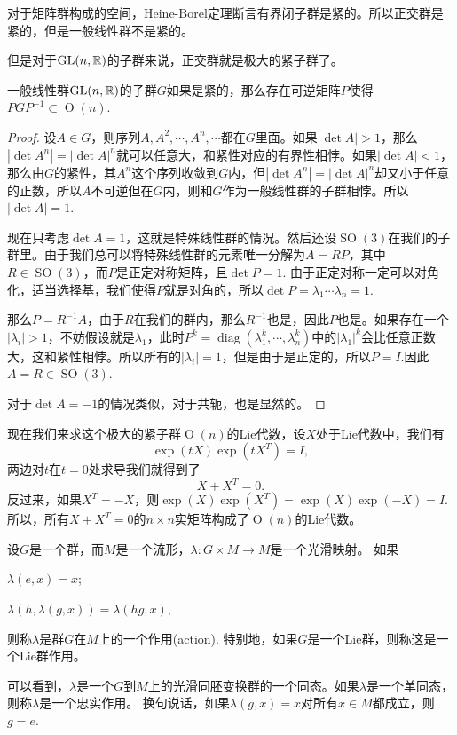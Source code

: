 对于矩阵群构成的空间，Heine-Borel定理断言有界闭子群是紧的。所以正交群是紧的，但是一般线性群不是紧的。

但是对于$\operatorname{GL}(n,\mathbb{R})$的子群来说，正交群就是极大的紧子群了。

\begin{pro}
一般线性群$\operatorname{GL}(n,\mathbb{R})$的子群$G$如果是紧的，那么存在可逆矩阵$P$使得$PGP^{-1}\subset \operatorname{O}(n)$.
\end{pro} 

\begin{proof}
设$A\in G$，则序列$A,A^2,\cdots,A^n,\cdots$都在$G$里面。如果$|\det A|>1$，那么$|\det A^n|=|\det A|^n$就可以任意大，和紧性对应的有界性相悖。如果$|\det A|<1$，那么由$G$的紧性，其$A^n$这个序列收敛到$G$内，但$|\det A^n|=|\det A|^n$却又小于任意的正数，所以$A$不可逆但在$G$内，则和$G$作为一般线性群的子群相悖。所以$|\det A|=1$.

现在只考虑$\det A=1$，这就是特殊线性群的情况。然后还设$\operatorname{SO}(3)$在我们的子群里。由于我们总可以将特殊线性群的元素唯一分解为$A=RP$，其中$R\in \operatorname{SO}(3)$，而$P$是正定对称矩阵，且$\det P=1$. 由于正定对称一定可以对角化，适当选择基，我们使得$P$就是对角的，所以$\det P=\lambda_1\cdots\lambda_n=1$.

那么$P=R^{-1}A$，由于$R$在我们的群内，那么$R^{-1}$也是，因此$P$也是。如果存在一个$|\lambda_i|>1$，不妨假设就是$\lambda_1$，此时$P^{k}=\operatorname{diag}(\lambda_1^k,\cdots,\lambda_n^k)$中的$|\lambda_1|^k$会比任意正数大，这和紧性相悖。所以所有的$|\lambda_i|=1$，但是由于是正定的，所以$P=I$.因此$A=R\in\operatorname{SO}(3)$.

对于$\det A=-1$的情况类似，对于共轭，也是显然的。 
\end{proof}

现在我们来求这个极大的紧子群$\operatorname{O}(n)$的Lie代数，设$X$处于Lie代数中，我们有
\[
	\exp(tX)\exp(tX^T)=I,
\]
两边对$t$在$t=0$处求导我们就得到了
\[
	X+X^T=0.
\]
反过来，如果$X^T=-X$，则$\exp(X)\exp(X^T)=\exp(X)\exp(-X)=I$. 所以，所有$X+X^T=0$的$n\times n$实矩阵构成了$\operatorname{O}(n)$的Lie代数。

\begin{para}[群作用]
设$G$是一个群，而$M$是一个流形，$\lambda:G\times M\to M$是一个光滑映射。
如果
\begin{compactenum}
\item $\lambda(e,x)=x$;
\item $\lambda(h,\lambda(g,x))=\lambda(hg,x)$,
\end{compactenum}
则称$\lambda$是群$G$在$M$上的一个作用(action). 特别地，如果$G$是一个Lie群，则称这是一个Lie群作用。

可以看到，$\lambda$是一个$G$到$M$上的光滑同胚变换群的一个同态。如果$\lambda$是一个单同态，则称$\lambda$是一个忠实作用。
换句说话，如果$\lambda(g,x)=x$对所有$x\in M$都成立，则$g=e$. 
\end{para}

